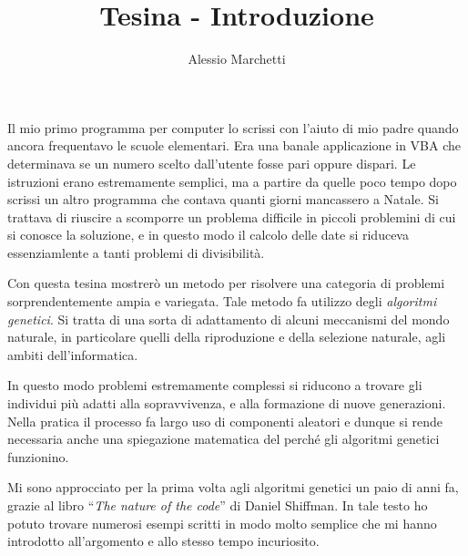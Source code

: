 \documentclass[a4paper, 11pt]{article}
\title{\myfont Tesina - Introduzione}
\author{Alessio Marchetti}
\date{}
\begin{document}
\maketitle

Il mio primo programma per computer lo scrissi con l'aiuto di mio padre quando
ancora frequentavo le scuole elementari. Era una banale applicazione in VBA
che determinava se un numero scelto dall'utente fosse pari oppure dispari. Le
istruzioni erano estremamente semplici, ma a partire da quelle poco tempo dopo 
scrissi un altro programma che contava quanti giorni mancassero a Natale. Si
trattava di riuscire a scomporre un problema difficile in piccoli problemini di
cui si conosce la soluzione, e in questo modo il calcolo delle date si riduceva
essenziamlente a tanti problemi di divisibilit\`a.

Con questa tesina mostrer\`o un metodo per risolvere una categoria di problemi
sorprendentemente ampia e variegata. Tale metodo fa utilizzo degli
\textit{algoritmi genetici}. Si tratta di una sorta di adattamento di alcuni
meccanismi del mondo naturale, in particolare quelli della riproduzione e della
selezione naturale, agli ambiti dell'informatica. 

In questo modo problemi estremamente complessi si riducono a trovare gli
individui pi\`u adatti alla sopravvivenza, e alla formazione di nuove
generazioni. Nella pratica il processo fa largo uso di componenti aleatori e
dunque si rende necessaria anche una spiegazione matematica del perch\'e gli
algoritmi genetici funzionino. 

Mi sono approcciato per la prima volta agli algoritmi genetici un paio di anni
fa, grazie al libro ``\textit{The nature of the code}'' di Daniel Shiffman. In
tale testo ho potuto trovare numerosi esempi scritti in modo molto semplice che
mi hanno introdotto all'argomento e allo stesso tempo incuriosito. 
\end{document}
